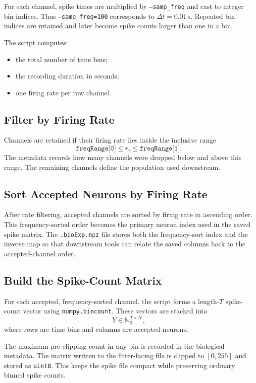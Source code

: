 \documentclass[11pt]{article}
\begin{document}
For each channel, spike times are multiplied by \texttt{--samp\_freq} and
cast to integer bin indices. Thus \texttt{--samp\_freq=100} corresponds to
\(\Delta t=0.01\,\mathrm{s}\). Repeated bin indices are retained and later
become spike counts larger than one in a bin.

The script computes:
\begin{itemize}
  \item the total number of time bins;
  \item the recording duration in seconds;
  \item one firing rate per raw channel.
\end{itemize}

\subsection{Filter by Firing Rate}

Channels are retained if their firing rate lies inside the inclusive range
\[
\texttt{freqRange[0]} \le r_i \le \texttt{freqRange[1]}.
\]
The metadata records how many channels were dropped below and above this
range. The remaining channels define the population used downstream.

\subsection{Sort Accepted Neurons by Firing Rate}

After rate filtering, accepted channels are sorted by firing rate in
ascending order. This frequency-sorted order becomes the primary neuron
index used in the saved spike matrix. The \texttt{.bioExp.npz} file stores
both the frequency-sort index and the inverse map so that downstream tools
can relate the saved columns back to the accepted-channel order.

\subsection{Build the Spike-Count Matrix}

For each accepted, frequency-sorted channel, the script forms a
length-\(T\) spike-count vector using \texttt{numpy.bincount}. These vectors
are stacked into
\[
Y \in \mathbb{N}_0^{T\times N},
\]
where rows are time bins and columns are accepted neurons.

The maximum pre-clipping count in any bin is recorded in the biological
metadata. The matrix written to the fitter-facing file is clipped to
\([0,255]\) and stored as \texttt{uint8}. This keeps the spike file compact
while preserving ordinary binned spike counts.
\end{document}

